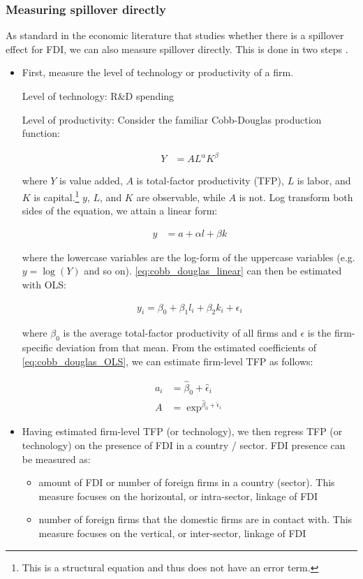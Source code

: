 \subsubsection*{Measuring spillover directly}

As standard in the economic literature that studies whether there is a spillover effect for FDI, we can also measure spillover directly. This is done in two steps \citep{VanBeveren2012}.

\begin{itemize}
\item First, measure the level of technology or productivity of a firm.

Level of technology: R\&D spending

Level of productivity: Consider the familiar Cobb-Douglas production function:

\begin{align}
Y &= AL^{\alpha}K^{\beta}
\end{align}

where $Y$ is value added, $A$ is total-factor productivity (TFP), $L$ is labor, and $K$ is capital.\footnote{This is a structural equation and thus does not have an error term.} $y$, $L$, and $K$ are observable, while $A$ is not. Log transform both sides of the equation, we attain a linear form:

\begin{align} \label{eq:cobb_douglas_linear}
y &= a + \alpha l + \beta k
\end{align}

where the lowercase variables are the log-form of the uppercase variables (e.g. $y = \log(Y)$ and so on). \autoref{eq:cobb_douglas_linear} can then be estimated with OLS:

\begin{align} \label{eq:cobb_douglas_OLS}
y_i = \beta_0 + \beta_1 l_i + \beta_2 k_i + \epsilon_i
\end{align} 

where $\beta_0$ is the average total-factor productivity of all firms and $\epsilon$ is the firm-specific deviation from that mean. From the estimated coefficients of \autoref{eq:cobb_douglas_OLS}, we can estimate firm-level TFP as follows:

\begin{align}
a_i &= \hat\beta_0 + \hat\epsilon_i \\
A &= \exp^{\hat\beta_0 + \hat\epsilon_i}
\end{align}

\item Having estimated firm-level TFP (or technology), we then regress TFP (or technology) on the presence of FDI in a country / sector. FDI presence can be measured as:
\begin{itemize}
\item amount of FDI or number of foreign firms in a country (sector). This measure focuses on the horizontal, or intra-sector, linkage of FDI
\item number of foreign firms that the domestic firms are in contact with. This measure focuses on the vertical, or inter-sector, linkage of FDI
\end{itemize}
\end{itemize}

